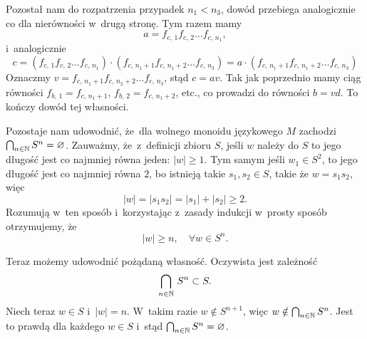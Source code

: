 \documentclass[a4paper,11pt]{article}
\begin{document}
Pozostał nam do rozpatrzenia przypadek $n_{ 1 } < n_{ 3 }$, dowód przebiega
analogicznie co dla nierówności w~drugą stronę. Tym razem mamy
\begin{equation}
  \label{eq:Forys-Forys-34}
  a = f_{ c,\, 1 } f_{ c,\, 2 } \ldots f_{ c,\, n_{ 1 } },
\end{equation}
i~analogicznie
\begin{equation}
  \label{eq:Forys-Forys-35}
  c =
  ( f_{ c,\, 1 } f_{ c,\, 2 } \ldots f_{ c,\, n_{ 1 } })
  \cdot ( f_{ c,\, n_{ 1 } + 1 } f_{ c,\, n_{ 1 } + 2 } \ldots f_{ c,\, n_{ 3 } } )
  =
  a \cdot ( f_{ c,\, n_{ 1 } + 1 } f_{ c,\, n_{ 1 } + 2 } \ldots f_{ c,\, n_{ 3 } } )
\end{equation}
Oznaczmy $v = f_{ c,\, n_{ 1 } + 1 } f_{ c,\, n_{ 2 } + 2 } \ldots f_{ c,\, n_{ 3 } }$,
stąd $c = a v$. Tak jak poprzednio mamy ciąg równości
$f_{ b,\, 1 } = f_{ c,\, n_{ 1 } + 1 }$, $f_{ b,\, 2 } = f_{ c,\, n_{ 1 } + 2 }$, etc.,
co prowadzi do równości $b = v d$. To kończy dowód tej własności.

Pozostaje nam udowodnić, że~dla wolnego monoidu językowego $M$ zachodzi
$\bigcap_{ n \in \mathbb{N} } S^{ n } = \varnothing$. Zauważmy, że~z~definicji zbioru $S$, jeśli $w$
należy do $S$ to jego długość jest co najmniej równa jeden: $| w | \geq 1$. Tym
samym jeśli $w_{ 1 } \in S^{ 2 }$, to jego długość jest co najmniej równa $2$, bo istnieją takie $s_{ 1 }, s_{ 2 } \in S$, takie że $w = s_{ 1 } s_{ 2 }$, więc
\begin{equation}
  \label{eq:1}
  | w | = | s_{ 1 } s_{ 2 } | = | s_{ 1 } | + | s_{ 2 } | \geq 2.
\end{equation}
Rozumują w~ten sposób i~korzystając z~zasady indukcji w~prosty sposób otrzymujemy, że
\begin{equation}
  \label{eq:2}
  | w | \geq n, \quad \forall w \in S^{ n }.
\end{equation}

Teraz możemy udowodnić pożądaną własność. Oczywista jest zależność
\begin{equation}
  \label{eq:3}
  \bigcap_{ n \in \mathbb{N} } \, S^{ n } \subset S.
\end{equation}
Niech teraz $w \in S$ i~$| w | = n$. W~takim razie $w \notin S^{ n + 1 }$,
więc $w \notin \bigcap_{ n \in \mathbb{N} } S^{ n }$. Jest to prawdą dla każdego $w \in S$
i~stąd $\bigcap_{ n \in \mathbb{N} } S^{ n } = \varnothing$.

\vspace{\spaceFour}
\end{document}
